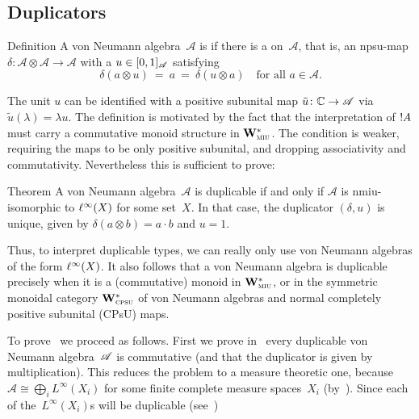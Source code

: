 \documentclass[a]{subfiles}
\begin{document}
\subsection{Duplicators}
\begin{parsec}%
\begin{point}{Definition}%
A von Neumann algebra~$\mathscr{A}$
is 
if there is a  on~$\mathscr{A}$,
that is,
an npsu-map
$\delta\colon \mathscr{A}\otimes \mathscr{A}\to\mathscr{A}$
with a  $u\in [0,1]_{\mathscr{A}}$ 
satisfying
\begin{equation*}
\delta(a\otimes u)\ =\ a\ = \ \delta(u\otimes a)
\quad\text{for all~$a\in\mathscr{A}$.}
\end{equation*}
\end{point}

\noindent
The unit $u$ can be identified with
a positive subunital map $\tilde{u}\colon \mathbb{C}\to \mathscr{A}$ via $\tilde{u}(\lambda)=\lambda u$.
The definition is motivated by the fact that the interpretation of $\mathord{!} A$
must carry a commutative monoid structure in $\mathbf{W}^*_{\text{\textsc{miu}}}$.
The condition is weaker, requiring the maps to be only positive subunital,
and dropping associativity and commutativity.
Nevertheless this is sufficient to prove:
\begin{point}[duplicable]{Theorem}%
A von Neumann algebra~$\mathscr{A}$
is duplicable if and only if
$\mathscr{A}$ is nmiu-isomorphic to $\ell^\infty(X)$ for some set~$X$.
In that case, the duplicator $(\delta,u)$
is unique, given by
$\delta(a\otimes b) = a\cdot b$ and $u=1$.
\begin{point}%
Thus, to interpret duplicable types,
we can really only use von Neumann algebras of the form $\ell^\infty(X)$.
It also follows that a von Neumann algebra
is duplicable precisely when it is a (commutative) monoid
in $\mathbf{W}^*_{\text{\textsc{miu}}}$, or in the 
symmetric monoidal category $\mathbf{W}^*_{\text{\textsc{cpsu}}}$ of von Neumann algebras
and normal completely positive subunital (CPsU) maps.
\end{point}
\begin{point}%
To prove~
we proceed as follows.
First we prove 
in~
every duplicable von Neumann algebra~$\mathscr{A}$
is commutative (and that the duplicator is given by multiplication).
This reduces the problem
to a measure theoretic one,
because~$\mathscr{A} \cong \bigoplus_i L^\infty(X_i)$
for some finite complete measure spaces~$X_i$
(by~).
Since each of the~$L^\infty(X_i)$s will be duplicable
(see~)

\end{point}
\end{point}
\end{parsec}
\end{document}
